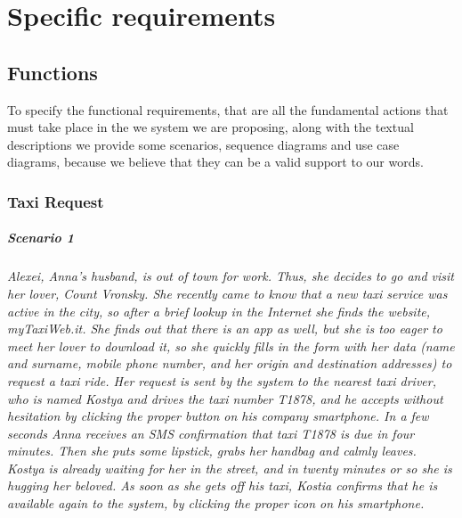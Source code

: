 \chapter{Specific requirements}\label{chap:requirements}


\section{Functions}
To specify the functional requirements, that are all the fundamental actions that must take place in the we system we are proposing, along with the textual descriptions we provide some scenarios, sequence diagrams and use case diagrams, because we believe that they can be a valid support to our words.


\subsection{Taxi Request}\label{subsec:taxiRequest}


\paragraph{Scenario 1}{\small\itshape Alexei, Anna's husband, is out of town for work. Thus, she decides to go and visit her lover, Count Vronsky. She recently came to know that a new taxi service was active in the city, so after a brief lookup in the Internet she finds the website, myTaxiWeb.it. She finds out that there is an app as well, but she is too eager to meet her lover to download it, so she quickly fills in the form with her data (name and surname, mobile phone number, and her origin and destination addresses) to request a taxi ride. Her request is sent by the system to the nearest taxi driver, who is named Kostya and drives the taxi number T1878, and he accepts without hesitation by clicking the proper button on his company smartphone. In a few seconds Anna receives an SMS confirmation that taxi T1878 is due in four minutes. Then she puts some lipstick, grabs her handbag and calmly leaves. Kostya is already waiting for her in the street, and in twenty minutes or so she is hugging her beloved. As soon as she gets off his taxi, Kostia confirms that he is available again to the system, by clicking the proper icon on his smartphone.}


